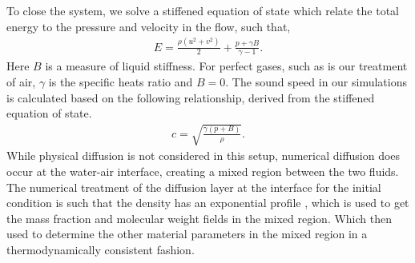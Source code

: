 To close the system, we solve a stiffened equation of state which
relate the total energy to the pressure and velocity in the flow, such
that,
% 
\begin{align} \label{eq:stiffened_eos}%
  E=\frac{\rho\left(u^2+v^2\right)}{2} + \frac{p+\gamma B}{\gamma-1}.
\end{align}
% 
Here $B$ is a measure of liquid stiffness. For perfect gases, such as
is our treatment of air, $\gamma$ is the specific heats ratio and
$B=0$. The sound speed in our simulations is calculated based on the
following relationship, derived from the stiffened equation of state.
% 
\begin{align}
  c = \sqrt{\frac{\gamma\left(p+B\right)}{\rho}}.
\end{align}
% 
While physical diffusion is not considered in this setup, numerical
diffusion does occur at the water-air interface, creating a mixed
region between the two fluids. The numerical treatment of the
diffusion layer at the interface for the initial condition is such
that the density has an exponential profile \citep{Latini2007}, which
is used to get the mass fraction and molecular weight fields in the
mixed region. Which then used to determine the other material
parameters in the mixed region in a thermodynamically consistent
fashion.

